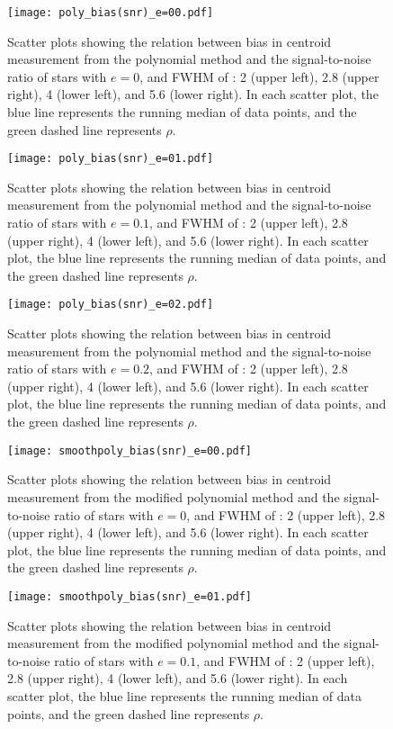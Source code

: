 \documentclass[12pt, preprint]{aastex}
\begin{document}
\begin{figure}[!htb]
  \texttt{[image: poly\_bias(snr)\_e=00.pdf]}
\endminipage
\caption{Scatter plots showing the relation between bias in centroid measurement from the polynomial method and the signal-to-noise ratio of stars with $e=0$, and FWHM of : 2 (upper left), 2.8 (upper right), 4 (lower left), and 5.6 (lower right). In each scatter plot, the blue line represents the running median of data points, and the green dashed line represents $\rho$.}\label{1}
\end{figure}

\begin{figure}[!htb]
  \texttt{[image: poly\_bias(snr)\_e=01.pdf]}
\endminipage
\caption{Scatter plots showing the relation between bias in centroid measurement from the polynomial method and the signal-to-noise ratio of stars with $e=0.1$, and FWHM of : 2 (upper left), 2.8 (upper right), 4 (lower left), and 5.6 (lower right). In each scatter plot, the blue line represents the running median of data points, and the green dashed line represents $\rho$.}\label{2}
\end{figure}

\begin{figure}[!htb]
  \texttt{[image: poly\_bias(snr)\_e=02.pdf]}
\endminipage
\caption{Scatter plots showing the relation between bias in centroid measurement from the polynomial method and the signal-to-noise ratio of stars with $e=0.2$, and FWHM of : 2 (upper left), 2.8 (upper right), 4 (lower left), and 5.6 (lower right). In each scatter plot, the blue line represents the running median of data points, and the green dashed line represents $\rho$.}\label{3}
\end{figure}

\begin{figure}[!htb]
  \texttt{[image: smoothpoly\_bias(snr)\_e=00.pdf]}
\endminipage
\caption{Scatter plots showing the relation between bias in centroid measurement from the modified polynomial method and the signal-to-noise ratio of stars with $e=0$, and FWHM of : 2 (upper left), 2.8 (upper right), 4 (lower left), and 5.6 (lower right). In each scatter plot, the blue line represents the running median of data points, and the green dashed line represents $\rho$.}\label{4}
\end{figure}

\begin{figure}[!htb]
  \texttt{[image: smoothpoly\_bias(snr)\_e=01.pdf]}
\endminipage
\caption{Scatter plots showing the relation between bias in centroid measurement from the modified polynomial method and the signal-to-noise ratio of stars with $e=0.1$, and FWHM of : 2 (upper left), 2.8 (upper right), 4 (lower left), and 5.6 (lower right). In each scatter plot, the blue line represents the running median of data points, and the green dashed line represents $\rho$.}\label{5}
\end{figure}
\end{document}
